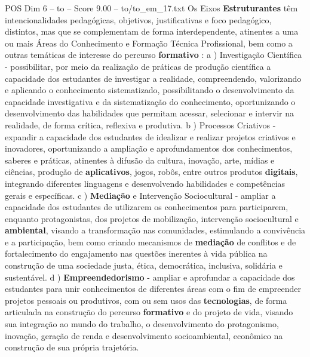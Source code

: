 \begin{textsample}{POS Dim 6 – to – Score 9.00 – to/to\_em\_17.txt}
Os Eixos \textbf{Estruturantes} têm intencionalidades pedagógicas, objetivos, justificativas e foco pedagógico, distintos, mas que se complementam de forma interdependente, atinentes a uma ou mais Áreas do Conhecimento e Formação Técnica Profissional, bem como a outras temáticas de interesse do percurso \textbf{formativo} : a ) Investigação Científica - possibilitar, por meio da realização de práticas de produção científica a capacidade dos estudantes de investigar a realidade, compreendendo, valorizando e aplicando o conhecimento sistematizado, possibilitando o desenvolvimento da capacidade investigativa e da sistematização do conhecimento, oportunizando o desenvolvimento das habilidades que permitam acessar, selecionar e intervir na realidade, de forma crítica, reflexiva e produtiva. b ) Processos Criativos - expandir a capacidade dos estudantes de idealizar e realizar projetos criativos e inovadores, oportunizando a ampliação e aprofundamentos dos conhecimentos, saberes e práticas, atinentes à difusão da cultura, inovação, arte, mídias e ciências, produção de \textbf{aplicativos}, jogos, robôs, entre outros produtos \textbf{digitais}, integrando diferentes linguagens e desenvolvendo habilidades e competências gerais e específicas. c ) \textbf{Mediação} e Intervenção Sociocultural - ampliar a capacidade dos estudantes de utilizarem os conhecimentos para participarem, enquanto protagonistas, dos projetos de mobilização, intervenção sociocultural e \textbf{ambiental}, visando a transformação nas comunidades, estimulando a convivência e a participação, bem como criando mecanismos de \textbf{mediação} de conflitos e de fortalecimento do engajamento nas questões inerentes à vida pública na construção de uma sociedade justa, ética, democrática, inclusiva, solidária e sustentável. d ) \textbf{Empreendedorismo} - ampliar e aprofundar a capacidade dos estudantes para unir conhecimentos de diferentes áreas com o fim de empreender projetos pessoais ou produtivos, com ou sem usos das \textbf{tecnologias}, de forma articulada na construção do percurso \textbf{formativo} e do projeto de vida, visando sua integração ao mundo do trabalho, o desenvolvimento do protagonismo, inovação, geração de renda e desenvolvimento socioambiental, econômico na construção de sua própria trajetória.

\end{textsample}
